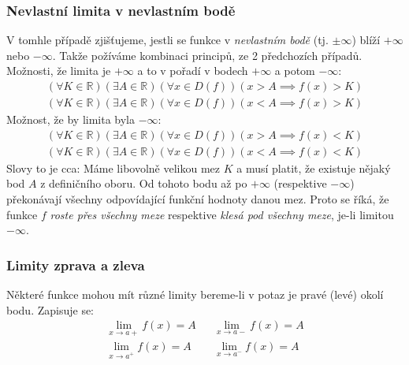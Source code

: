 \documentclass[12pt]{article}
\newcommand{\nR}{\mathbb{R}} %
\begin{document}
\subsubsection{Nevlastní limita v nevlastním bodě}
V tomhle případě zjišťujeme, jestli se funkce v \emph{nevlastním bodě} (tj. $\pm \infty$) blíží $+ \infty$ nebo $-\infty$. Takže požíváme kombinaci principů, ze 2 předchozích případů.\\
Možnosti, že limita je $+\infty$ a to v pořadí v bodech $+\infty$ a potom $-\infty$:
\begin{align}
( \forall K \in \nR )( \exists A \in \nR )( \forall x \in D(f)) (x >A \implies f(x) > K)\\
( \forall K \in \nR )( \exists A \in \nR )( \forall x \in D(f)) (x < A \implies f(x) > K)
\end{align}
Možnost, že by limita byla $-\infty$:
\begin{align}
( \forall K \in \nR )( \exists A \in \nR )( \forall x \in D(f)) (x >A \implies f(x) < K)\\
( \forall K \in \nR )( \exists A \in \nR )( \forall x \in D(f)) (x < A \implies f(x) < K)
\end{align}
Slovy to je cca: Máme libovolně velikou mez $K$ a musí platit, že existuje nějaký bod $A$ z definičního oboru. Od tohoto bodu až po $+ \infty$ (respektive $- \infty$) překonávají všechny odpovídající funkční hodnoty danou mez. Proto se říká, že funkce $f$ \emph{roste přes všechny meze} respektive \emph{klesá pod všechny meze}, je-li limitou $- \infty$.
\subsubsection{Limity zprava a zleva}
Některé funkce mohou mít různé limity bereme-li v potaz je pravé (levé) okolí bodu. Zapisuje se:
\begin{align}
\lim _{x\to a+}f(x)=A && \lim _{x\to a-}f(x)=A\\
\lim _{x\to a^{+}}f(x)=A && \lim _{x\to a^{-}}f(x)=A
\end{align}
\end{document}
